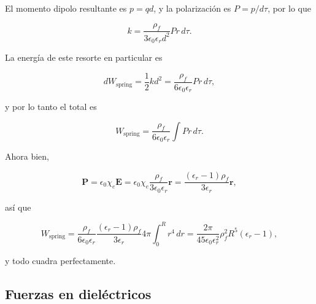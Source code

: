\documentclass[12pt,a4paper]{report}
\newcommand{\esp}{\vspace{0.5cm}}
\begin{document}
	\esp
	
	El momento dipolo resultante es $p = qd$, y la polarización es $P = p/d\tau$, por lo que
	
	\esp
	
	\begin{equation}
		k = \frac{\rho_f}{3\epsilon_0\epsilon_r d^2} Pr \, d\tau .
	\end{equation}
	
	\esp
	
	La energía de este resorte en particular es
	
	\esp
	
	\begin{equation}
		dW_{\text{spring}} = \frac{1}{2}kd^2 = \frac{\rho_f}{6\epsilon_0\epsilon_r} Pr \, d\tau ,
	\end{equation}
	
	\esp
	
	\noindent y por lo tanto el total es
	
	\esp
	
	\begin{equation}
		W_{\text{spring}} = \frac{\rho_f}{6\epsilon_0\epsilon_r} \int Pr \, d\tau .
	\end{equation}
	
	\esp
	
	Ahora bien,
	
	\esp
	
	\begin{equation}
		\mathbf{P} = \epsilon_0\chi_e \mathbf{E} = \epsilon_0\chi_e \frac{\rho_f}{3\epsilon_0\epsilon_r} \mathbf{r} = \frac{(\epsilon_r - 1)\rho_f}{3\epsilon_r} \mathbf{r} ,
	\end{equation}
	
	\esp
	
	\noindent así que
	
	\esp
	
	\begin{equation}
		W_{\text{spring}} = \frac{\rho_f}{6\epsilon_0\epsilon_r} \frac{(\epsilon_r - 1)\rho_f}{3\epsilon_r} 4\pi \int_0^R r^4 \, dr = \frac{2\pi}{45\epsilon_0\epsilon_r^2} \rho_f^2 R^5 (\epsilon_r - 1) ,
	\end{equation}
	
	\esp
	
	\noindent y todo cuadra perfectamente.
	
	\esp
	
	\subsection{Fuerzas en dieléctricos}
	
\end{document}
